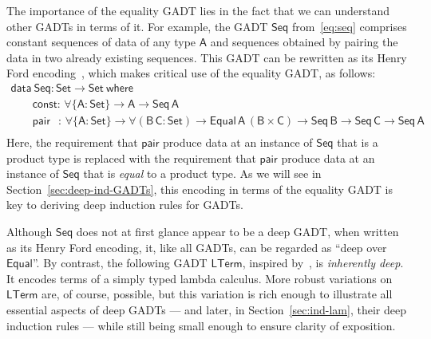 \documentclass[9pt]{entcs}
\begin{document}
The importance of the equality GADT lies in the fact that we can
understand other GADTs in terms of it. For example, the GADT
$\mathsf{Seq}$ from~\eqref{eq:seq} comprises constant sequences of
data of any type $\mathsf{A}$ and sequences obtained by pairing the
data in two already existing sequences. This GADT can be rewritten as
its Henry Ford encoding~\cite{ch03,hin03,mcb99,sjsv09,sp04}, which
makes critical use of the equality GADT, as follows:
\begin{equation}\label{eq:eq_seq}
\begin{array}{l}
\mathsf{data\ Seq : Set \to Set\ where}\\
\mathsf{\;\;\;\;\;\;\;const :\, \forall \{A : Set\} \to A \to Seq\,A}\\ 
\mathsf{\;\;\;\;\;\;\;pair\,\;\; :\, \forall \{A : Set\} \to \forall (B\,C : Set) \to
  Equal\,A\,(B \times C) \to Seq\,B \to Seq\,C \to Seq\,A}\\ 
\end{array}
\end{equation}
Here, the requirement that $\mathsf{pair}$ produce data at an instance
of $\mathsf{Seq}$ that is a product type is replaced with the
requirement that $\mathsf{pair}$ produce data at an instance of
$\mathsf{Seq}$ that is \emph{equal} to a product type. As we will see
in Section~\ref{sec:deep-ind-GADTs}, this encoding in terms of the
equality GADT is key to deriving deep induction rules for GADTs.

Although $\mathsf{Seq}$ does not at first glance appear to be a deep
GADT, when written as its Henry Ford encoding, it, like all GADTs, can
be regarded as ``deep over $\mathsf{Equal}$''.  By contrast, the
 following GADT $\mathsf{LTerm}$, inspired by~\cite{cis194}, is {\em
   inherently deep}. It encodes terms of a simply typed lambda
 calculus. More robust variations on $\mathsf{LTerm}$ are, of course,
 possible, but this variation is rich enough to illustrate all
 essential aspects of deep GADTs --- and later, in
 Section~\ref{sec:ind-lam}, their deep induction rules --- while still
 being small enough to ensure clarity of exposition.
\end{document}
